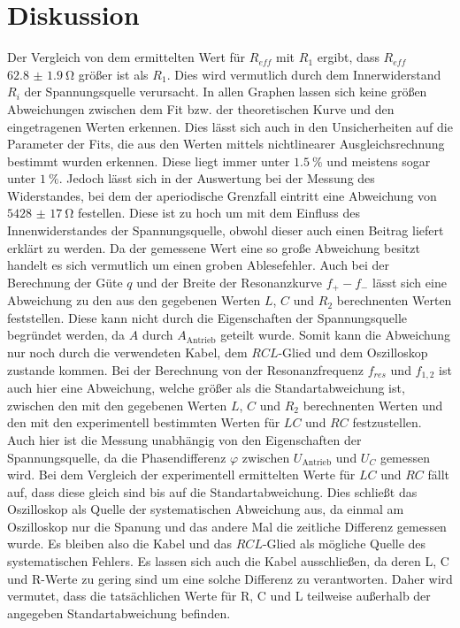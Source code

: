 \section{Diskussion}
\label{sec:Diskussion}
Der Vergleich von dem ermittelten Wert für $R_{eff}$ mit $R_1$ ergibt, dass $R_{eff}$ $\SI{62.8(19)}{\ohm}$ größer ist als $R_1$. Dies wird vermutlich durch dem Innerwiderstand $R_i$ der Spannungsquelle verursacht.
In allen Graphen lassen sich keine größen Abweichungen zwischen dem Fit bzw. der theoretischen Kurve und den eingetragenen Werten erkennen. Dies lässt sich auch in den Unsicherheiten auf die Parameter der Fits, die aus den Werten mittels nichtlinearer Ausgleichsrechnung bestimmt wurden erkennen. Diese liegt immer unter $\SI{1.5}{\percent}$ und meistens sogar unter $\SI{1}{\percent}$. Jedoch lässt sich in der Auswertung bei der Messung des Widerstandes, bei dem der aperiodische Grenzfall eintritt eine Abweichung von $\SI{5428(17)}{\ohm}$ festellen. Diese ist zu hoch um mit dem Einfluss des Innenwiderstandes der Spannungsquelle, obwohl dieser auch einen Beitrag liefert erklärt zu werden. Da der gemessene Wert eine so große Abweichung besitzt handelt es sich vermutlich um einen groben Ablesefehler. Auch bei der Berechnung der Güte $q$ und der Breite der Resonanzkurve $f_+ - f_-$ lässt sich eine Abweichung zu den aus den gegebenen Werten $L$, $C$ und $R_2$ berechnenten Werten feststellen. Diese kann nicht durch die Eigenschaften der Spannungsquelle begründet werden, da $A$ durch $A_{\text{Antrieb}}$ geteilt wurde. Somit kann die Abweichung nur noch durch die verwendeten Kabel, dem $RCL$-Glied und dem Oszilloskop zustande kommen. Bei der Berechnung von der Resonanzfrequenz $f_{res}$ und $f_{1,2}$ ist auch hier eine Abweichung, welche größer als die Standartabweichung ist, zwischen den mit den gegebenen Werten $L$, $C$ und $R_2$ berechnenten Werten und den mit den experimentell bestimmten Werten für $LC$ und $RC$ festzustellen. Auch hier ist die Messung unabhängig von den Eigenschaften der Spannungsquelle, da die Phasendifferenz $\varphi$ zwischen $U_{\text{Antrieb}}$ und $U_C$ gemessen wird. Bei dem Vergleich der experimentell ermittelten Werte für $LC$ und $RC$ fällt auf, dass diese gleich sind bis auf die Standartabweichung. Dies schließt das Oszilloskop als Quelle der systematischen Abweichung aus, da einmal am Oszilloskop nur die Spanung und das andere Mal die zeitliche Differenz gemessen wurde. Es bleiben also die Kabel und das $RCL$-Glied als mögliche Quelle des systematischen Fehlers. Es lassen sich auch die Kabel ausschließen, da deren L, C und R-Werte zu gering sind um eine solche Differenz zu verantworten. Daher wird vermutet, dass die tatsächlichen Werte für R, C und L teilweise außerhalb der angegeben Standartabweichung befinden.








	
